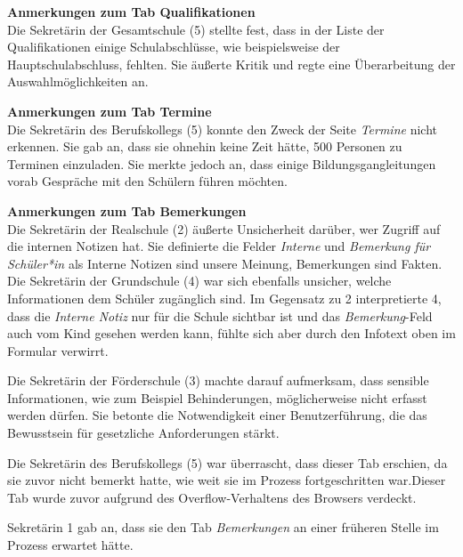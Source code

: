 \textbf{Anmerkungen zum Tab \glqq Qualifikationen\grqq{}}\\
Die Sekretärin der Gesamtschule (5) stellte fest, dass in der Liste der Qualifikationen einige Schulabschlüsse, wie beispielsweise der Hauptschulabschluss, fehlten. Sie äußerte Kritik und regte eine Überarbeitung der Auswahlmöglichkeiten an.

\textbf{Anmerkungen zum Tab \glqq Termine\grqq{}}\\
Die Sekretärin des Berufskollegs (5) konnte den Zweck der Seite \textit{Termine} nicht erkennen. Sie gab an, dass sie ohnehin keine Zeit hätte, 500 Personen zu Terminen einzuladen. Sie merkte jedoch an, dass einige Bildungsgangleitungen vorab Gespräche mit den Schülern führen möchten.

\textbf{Anmerkungen zum Tab \glqq Bemerkungen\grqq{}}\\
Die Sekretärin der Realschule (2) äußerte Unsicherheit darüber, wer Zugriff auf die internen Notizen hat. Sie definierte die Felder \textit{Interne} und \textit{Bemerkung für Schüler*in} als \glqq Interne Notizen sind unsere Meinung, Bemerkungen sind Fakten\grqq{}. Die Sekretärin der Grundschule (4) war sich ebenfalls unsicher, welche Informationen dem Schüler zugänglich sind. Im Gegensatz zu 2 interpretierte 4, dass die \textit{Interne Notiz} nur für die Schule sichtbar ist und das \textit{Bemerkung}-Feld auch vom Kind gesehen werden kann, fühlte sich aber durch den Infotext oben im Formular verwirrt.

Die Sekretärin der Förderschule (3) machte darauf aufmerksam, dass sensible Informationen, wie zum Beispiel Behinderungen, möglicherweise nicht erfasst werden dürfen. Sie betonte die Notwendigkeit einer Benutzerführung, die das Bewusstsein für gesetzliche Anforderungen stärkt.

Die Sekretärin des Berufskollegs (5) war überrascht, dass dieser Tab erschien, da sie zuvor nicht bemerkt hatte, wie weit sie im Prozess fortgeschritten war.Dieser Tab wurde zuvor aufgrund des Overflow-Verhaltens des Browsers verdeckt.

Sekretärin 1 gab an, dass sie den Tab \textit{Bemerkungen} an einer früheren Stelle im Prozess erwartet hätte.

